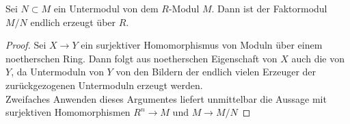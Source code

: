 \begin{lem}
	\label{lem:quotient}
	Sei $N\subset M$ ein Untermodul von dem $R$-Modul $M$. Dann ist der Faktormodul $M/N$ endlich erzeugt über $R$.
\end{lem}
\begin{proof}
	Sei $X \to Y$ ein surjektiver Homomorphismus von Moduln über einem noetherschen Ring. Dann folgt aus noetherschen Eigenschaft von $X$ auch die von $Y$, da Untermoduln von $Y$ von den Bildern der endlich vielen Erzeuger der zurückgezogenen Untermoduln erzeugt werden. \\
	Zweifaches Anwenden dieses Argumentes liefert unmittelbar die Aussage mit surjektiven Homomorphismen $R^n \to M$ und $M \to M/N$
\end{proof}

